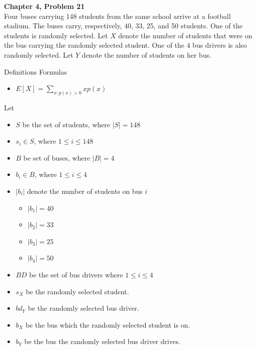 \documentclass{article}
\begin{document}
\begin{spacing}{1.1}
\newpage
\begin{homeworkProblem}
  {\bf Chapter 4, Problem 21}\\
  Four buses carrying 148 students from the same school arrive at 
  a football stadium. The buses carry, respectively, 40, 33, 25, 
  and 50 students. One of the students is randomly selected. 
  Let $X$ denote the number of students that were on the bus carrying 
  the randomly selected student. One of the 4 bus drivers is also 
  randomly selected. Let $Y$ denote the number of students on her bus.
  \begin{homeworkSection}{Definitions}
    Formulas
      \begin{itemize}
        \item $E[ X] = \sum\limits_{x:p( x) > 0}{ x p( x)}$
      \end{itemize}
    Let
      \begin{itemize}
        \item $S$ be the set of students, where $|S| = 148$
        \item $s_i \in S$, where $1 \le i \le 148$
        \item $B$ be set of buses, where $|B| = 4$
        \item $b_i \in B$, where $1 \le i \le 4$
        \item $|b_i|$ denote the number of students on bus $i$
          \begin{itemize}
            \item $|b_1| = 40$
            \item $|b_2| = 33$
            \item $|b_3| = 25$
            \item $|b_4| = 50$
          \end{itemize}
        \item $BD$ be the set of bus drivers where $1 \le i \le 4$
        \item $s_X$ be the randomly selected student.
        \item $bd_Y$ be the randomly selected bus driver.
        \item $b_X$ be the bus which the randomly selected student is on.
        \item $b_Y$ be the bus the randomly selected bus driver drives.
      \end{itemize}
  \end{homeworkSection}
  \begin{enumerate}[(a)]

\end{enumerate}
\end{homeworkProblem}
\end{spacing}
\end{document}
